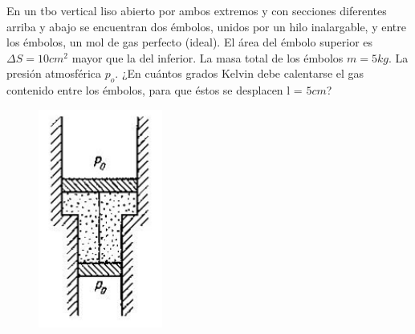 \begin{mdframed}[style=warning]
	\begin{ejercicio}
		En un tbo vertical liso abierto por ambos extremos y con secciones diferentes arriba y abajo se encuentran dos émbolos, unidos por un hilo inalargable, y entre los émbolos, un mol de gas perfecto (ideal). El área del émbolo superior es $\Delta S = 10cm^2$ mayor que la del inferior. La masa total de los émbolos $m = 5kg$. La presión atmosférica $p_o$. ¿En cuántos grados Kelvin debe calentarse el gas contenido entre los émbolos, para que éstos se desplacen l = $5cm$?
		\begin{figure}[H]
			\centering
			\includegraphics[scale=0.5]{./img/embolo.png}
			\label{embolo}
		\end{figure}
	\end{ejercicio}
\end{mdframed}













